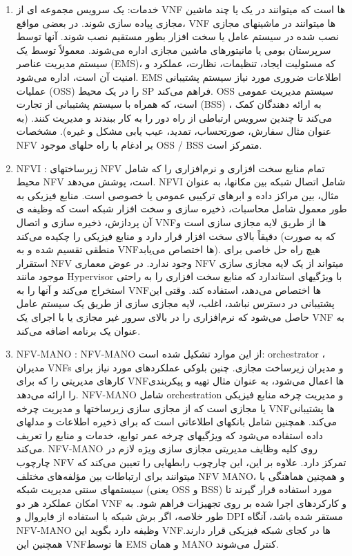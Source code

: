\begin{enumerate}
\item 
خدمات: یک سرویس مجموعه ای از VNF ها است که میتوانند در یک یا چند ماشین مجازی پیاده سازی شوند.
در بعضی مواقع، VNF ها میتوانند در ماشینهای مجازی نصب شده در سیستم عامل یا سخت افزار بطور مستقیم نصب شوند. آنها توسط سرپرستان بومی یا مانیتورهای ماشین مجازی اداره می‌شوند.
معمولاً توسط یک سیستم مدیریت عناصر  (EMS)،
 که مسئولیت ایجاد، تنظیمات، نظارت، عملکرد و امنیت آن است، اداره می‌شود.
 EMS 
 اطلاعات ضروری مورد نیاز سیستم پشتیبانی عملیات (OSS) را در یک محیط SP فراهم می‌کند.
 OSS
  سیستم مدیریت عمومی است، که  همراه با سیستم پشتیبانی از تجارت 
  (BSS)
 ، به ارائه دهندگان کمک می‌کند تا چندین سرویس ارتباطی از راه دور را به کار ببندند و مدیریت کنند.
  (به عنوان مثال سفارش، صورتحساب، تمدید، عیب یابی مشکل و غیره).
مشخصات NFV بر ادغام با راه حلهای موجود OSS / BSS متمرکز است.
\item NFVI
:
زیرساختهای NFV تمام منابع سخت افزاری و نرم‌افزاری را که شامل محیط NFV است، پوشش می‌دهد.
NFVI شامل اتصال شبکه بین مکانها، به عنوان مثال، بین
مراکز داده و ابرهای ترکیبی عمومی یا خصوصی است.
منابع فیزیکی به طور معمول شامل محاسبات، ذخیره سازی و سخت افزار شبکه است که وظیفه ی آن پردازش، ذخیره سازی و اتصال VNFها از طریق لایه مجازی سازی است و دقیقاً بالای سخت افزار قرار دارد و منابع فیزیکی را چکیده می‌کند (که به صورت منطقی تقسیم شده و به VNFها اختصاص می‌یابد).
هیچ راه حل خاصی برای استقرار NFV وجود ندارد. در عوض معماری NFV میتواند از یک لایه مجازی سازی موجود مانند Hypervisor با ویژگیهای استاندارد که منابع سخت افزاری را به راحتی استخراج می‌کند و آنها را به VNFها اختصاص می‌دهد، استفاده کند.
وقتی این پشتیبانی در دسترس نباشد، اغلب، لایه مجازی سازی از طریق یک سیستم عامل حاصل می‌شود که نرم‌افزاری را در بالای سرور غیر مجازی یا با اجرای یک VNF به عنوان یک برنامه اضافه می‌کند.
\item NFV-MANO
:
NFV-MANO
 از این موارد تشکیل شده است:
 orchestrator
،
 مدیران VNFs و مدیران زیرساخت مجازی.
 چنین بلوکی عملکردهای مورد نیاز برای کارهای مدیریتی را که برای VNFها اعمال می‌شود، به عنوان مثال تهیه و پیکربندی را  ارائه می‌دهد. 
 NFV-MANO شامل orchestration و مدیریت چرخه منابع فیزیکی یا مجازی است که از مجازی سازی زیرساختها و مدیریت چرخه VNFها پشتیبانی می‌کند.
 همچنین شامل بانکهای اطلاعاتی است که برای ذخیره اطلاعات و مدلهای داده استفاده می‌شود که ویژگیهای چرخه عمر توابع، خدمات و منابع را تعریف می‌کند.
 NFV-MANO روی کلیه وظایف مدیریتی مجازی سازی ویژه لازم در چارچوب NFV تمرکز دارد.
 علاوه بر این، این چارچوب رابطهایی را تعیین می‌کند که میتوانند برای ارتباطات بین مؤلفه‌‌های مختلف
  NFV MANO، 
 و همچنین هماهنگی با سیستمهای سنتی مدیریت شبکه (یعنی OSS و BSS) مورد استفاده قرار گیرند تا امکان عملکرد هر دو VNF و کارکردهای اجرا شده بر روی تجهیزات فراهم شود.
 به طور خلاصه، اگر برش شبکه با استفاده از فایروال و DPI مستقر شده باشد، آنگاه NFV-MANO وظیفه دارد بگوید این VNFها در کجای شبکه فیزیکی قرار دارند. همچنین این VNFها توسط EMS و همان MANO کنترل می‌شوند.
\end{enumerate}
